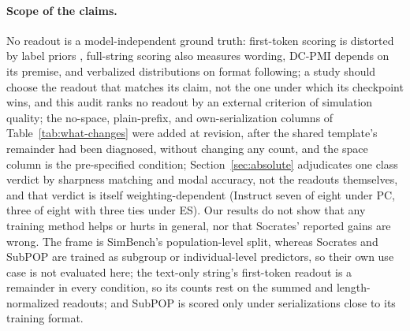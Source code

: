 \documentclass[11pt]{article}
\newcommand{\ES}{\textsc{ES}}
\newcommand{\PC}{\textsc{PC}}
\begin{document}
\paragraph{Scope of the claims.}
No readout is a model-independent ground truth: first-token scoring is
distorted by label priors \cite{wang-etal-2024-answer-c,zheng2024mcq},
full-string scoring also measures wording, DC-PMI depends on its premise, and
verbalized distributions on format following; a study should choose the
readout that matches its claim, not the one under which its checkpoint
wins, and this audit ranks no readout by an external criterion of simulation quality; the no-space, plain-prefix, and own-serialization columns of Table~\ref{tab:what-changes} were added at revision, after the shared template's remainder had been diagnosed, without changing any count, and the space column is the pre-specified condition; Section~\ref{sec:absolute} adjudicates one class verdict by sharpness matching and modal accuracy, not the readouts themselves, and that verdict is itself weighting-dependent (Instruct seven of eight under \PC{}, three of eight with three ties under \ES{}).
Our results do not show that any training method helps or hurts in general,
nor that Socrates' reported gains are wrong. The frame is SimBench's
population-level split, whereas Socrates and SubPOP are trained as
subgroup or individual-level predictors, so their own use case is not
evaluated here; the text-only string's first-token readout is a remainder in every condition, so its counts rest on the summed and length-normalized readouts; and SubPOP is scored
only under serializations close to its training format.
\end{document}
